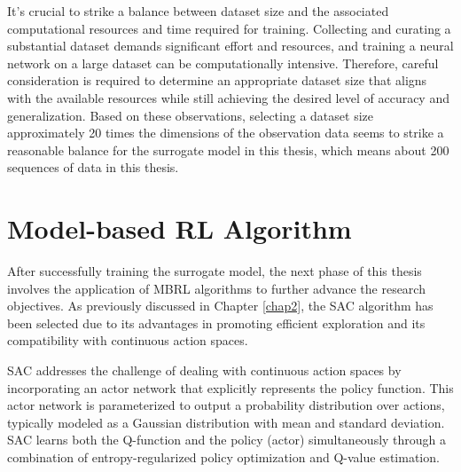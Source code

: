 It's crucial to strike a balance between dataset size and the associated computational resources and time required for training. Collecting and curating a substantial dataset demands significant effort and resources, and training a neural network on a large dataset can be computationally intensive. Therefore, careful consideration is required to determine an appropriate dataset size that aligns with the available resources while still achieving the desired level of accuracy and generalization. Based on these observations, selecting a dataset size approximately 20 times the dimensions of the observation data seems to strike a reasonable balance for the surrogate model in this thesis, which means about 200 sequences of data in this thesis.

\section{Model-based RL Algorithm}
After successfully training the surrogate model, the next phase of this thesis involves the application of \ac{MBRL} algorithms to further advance the research objectives. As previously discussed in Chapter \ref{chap2}, the \ac{SAC} algorithm has been selected due to its advantages in promoting efficient exploration and its compatibility with continuous action spaces. 

SAC addresses the challenge of dealing with continuous action spaces by incorporating an actor network that explicitly represents the policy function. This actor network is parameterized to output a probability distribution over actions, typically modeled as a Gaussian distribution with mean and standard deviation. SAC learns both the Q-function and the policy (actor) simultaneously through a combination of entropy-regularized policy optimization and Q-value estimation.

